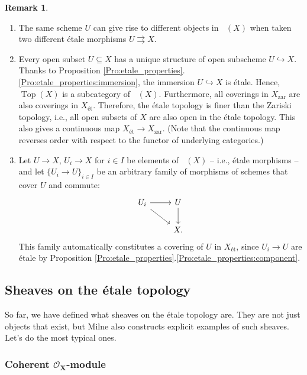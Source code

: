 \documentclass{report}
\DeclareMathOperator{\Top}{Top}
\DeclareMathOperator{\Et}{\acute{E}t}
\theoremstyle{definition}
\newtheorem{remark}[equation]{Remark}
\begin{document}
\begin{remark}
\begin{enumerate}
\item The same scheme $U$ can give rise to different objects in $\Et(X)$ when taken two different \'{e}tale morphisms $U\rightrightarrows X$.

\item Every open subset $U\subseteq X$ has a unique structure of open subscheme $U\hookrightarrow X$. Thanks to Proposition \ref{Pro:etale_properties}.\ref{Pro:etale_properties:immersion}, the immersion $U\hookrightarrow X$ is \'{e}tale. Hence, $\Top(X)$ is a subcategory of $\Et(X)$. Furthermore, all coverings in $X_{\text{zar}}$ are also coverings in $X_{\text{\'{e}t}}$. Therefore, the \'{e}tale topology is finer than the Zariski topology, i.e., all open subsets of $X$ are also open in the \'{e}tale topology. This also gives a continuous map $X_{\text{\'{e}t}}\rightarrow X_{\text{zar}}$. (Note that the continuous map reverses order with respect to the functor of underlying categories.)

\item Let $U\rightarrow X$, $U_i\rightarrow X$ for $i\in I$ be elements of $\Et(X)$ -- i.e., \'{e}tale morphisms -- and let $\{U_i\rightarrow U\}_{i\in I}$ be an arbitrary family of morphisms of schemes that cover $U$ and commute:
\[
\begin{tikzcd}
U_i\arrow[r]\arrow[rd]&U\arrow[d]\\
&X.
\end{tikzcd}
\]
This family automatically constitutes a covering of $U$ in $X_{\text{\'{e}t}}$, since $U_i\rightarrow U$ are \'{e}tale by Proposition \ref{Pro:etale_properties}.\ref{Pro:etale_properties:component}.
\end{enumerate}
\end{remark}

\subsection{Sheaves on the \'{e}tale topology}

So far, we have defined what sheaves on the \'{e}tale topology are. They are not just objects that exist, but Milne \cite[Section~I.6]{milne2013lectures} also constructs explicit examples of such sheaves. Let's do the most typical ones.

\subsubsection*{Coherent $\boldsymbol{\mathcal{O}_X}$-module}
\end{document}
